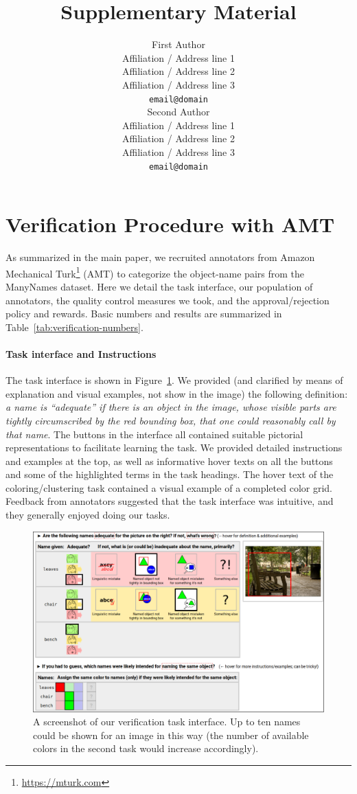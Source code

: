 \documentclass[11pt,a4paper]{article}
\title{Supplementary Material}
\author{First Author \\
	Affiliation / Address line 1 \\
	Affiliation / Address line 2 \\
	Affiliation / Address line 3 \\
	\texttt{email@domain} \\\And
	Second Author \\
	Affiliation / Address line 1 \\
	Affiliation / Address line 2 \\
	Affiliation / Address line 3 \\
	\texttt{email@domain} \\}
\date{}
\newcommand{\mn}{ManyNames\xspace}
\begin{document}
\section{Verification Procedure with AMT}
\label{sec:verif}
As summarized in the main paper, we recruited annotators from Amazon Mechanical Turk\footnote{
	\url{https://mturk.com}
} (AMT) to categorize the object-name pairs from the \mn dataset.
Here we detail the task interface, our population of annotators, the quality control measures we took, and the approval/rejection policy and rewards.
Basic numbers and results are summarized in Table~\ref{tab:verification-numbers}.

\paragraph{Task interface and Instructions}
The task interface is shown in Figure~\ref{fig:verification-interface}.
We provided (and clarified by means of explanation and visual examples, not show in the image) the following definition: \textit{a name is ``adequate'' if there is an object in the image, whose visible parts are tightly circumscribed by the red bounding box, that one could reasonably call by that name}.
The buttons in the interface all contained suitable pictorial representations to facilitate learning the task.
We provided detailed instructions and examples at the top, as well as informative hover texts on all the buttons and some of the highlighted terms in the task headings.
The hover text of the coloring/clustering task contained a visual example of a completed color grid.
Feedback from annotators suggested that the task interface was intuitive, and they generally enjoyed doing our tasks.
\begin{figure}[t]
	\centering
	\includegraphics[width=\textwidth]{images/verification-interface.pdf}
	\caption{A screenshot of our verification task interface. Up to ten names could be shown for an image in this way (the number of available colors in the second task would increase accordingly).}
	\label{fig:verification-interface}
\end{figure}
\end{document}
